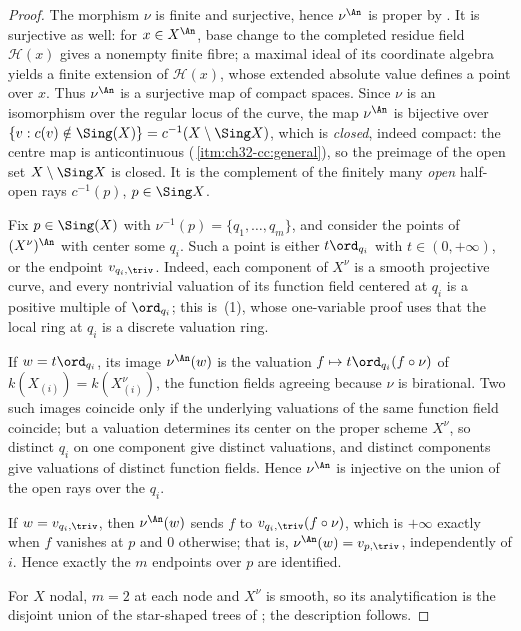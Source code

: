 \begin{proof}
The morphism $\nu$ is finite and surjective, hence
$\nu^{\An}$ is proper by .  It is
surjective as well: for $x\in X^{\An}$, base change to the completed residue
field $\mathcal H(x)$ gives a nonempty finite fibre; a maximal ideal of its
coordinate algebra yields a finite extension of $\mathcal H(x)$, whose
extended absolute value defines a point over $x$.  Thus $\nu^{\An}$ is a
surjective map of compact spaces.  Since $\nu$ is an isomorphism over the regular locus of the curve, the map $\nu^{\An}$ is bijective over
$\{v:c(v)\notin\Sing(X)\}=c^{-1}(X\setminus\Sing X)$, which is
\emph{closed}, indeed compact: the centre map is anticontinuous
(\,\cref{itm:ch32-cc:general}), so the preimage
of the open set $X\setminus\Sing X$ is closed.  It is the complement of the
finitely many \emph{open} half-open rays $c^{-1}(p)$, $p\in\Sing X$.

Fix $p\in\Sing(X)$ with $\nu^{-1}(p)=\{q_1,\ldots,q_m\}$, and consider
the points of $(X^\nu)^{\An}$ with center some $q_i$.  Such a point is
either $t\ord_{q_i}$ with $t\in(0,+\infty)$, or the endpoint
$v_{q_i,\triv}$.  Indeed, each component of $X^\nu$ is a smooth
projective curve, and every nontrivial valuation of its function field
centered at $q_i$ is a positive multiple of $\ord_{q_i}$; this is
\,(1), whose one-variable proof uses
that the local ring at $q_i$ is a discrete valuation ring.

If $w=t\ord_{q_i}$, its image $\nu^{\An}(w)$ is the valuation
$f\mapsto t\ord_{q_i}(f\circ\nu)$ of $k(X_{(i)})=k(X^\nu_{(i)})$, the
function fields agreeing because $\nu$ is birational.  Two such images
coincide only if the underlying valuations of the same function field
coincide; but a valuation determines its center on the proper scheme
$X^\nu$, so distinct $q_i$ on one component give distinct valuations, and
distinct components give valuations of distinct function fields.  Hence
$\nu^{\An}$ is injective on the union of the open rays over the $q_i$.

If $w=v_{q_i,\triv}$, then $\nu^{\An}(w)$ sends $f$ to
$v_{q_i,\triv}(f\circ\nu)$, which is $+\infty$ exactly when $f$
vanishes at $p$ and $0$ otherwise; that is, $\nu^{\An}(w)=v_{p,\triv}$,
independently of $i$.  Hence exactly the $m$ endpoints over $p$ are
identified.

For $X$ nodal, $m=2$ at each node and $X^\nu$ is smooth, so its
analytification is the disjoint union of the star-shaped trees of
; the description follows.
\end{proof}

